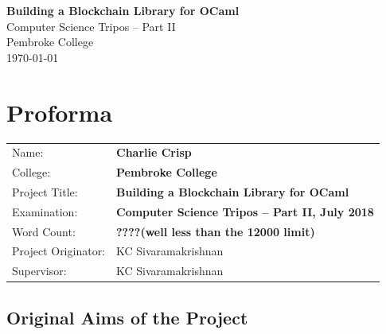 \documentclass[12pt,a4paper,twoside,openright]{report}
\begin{document}
	
	
	
	
	
	
	\pagestyle{empty}
	
	
	\vspace*{60mm}
	\begin{center}
	\Huge
	\textbf{Building a Blockchain Library for OCaml} \\[5mm]
	Computer Science Tripos -- Part II \\[5mm]
	Pembroke College \\[5mm]
	\today  %
	\end{center}
	
	
	\pagestyle{plain}
	
	\chapter*{Proforma}
	
	{\large
	\begin{tabular}{ll}
	Name:               & \bf Charlie Crisp                       \\
	College:            & \bf Pembroke College                     \\
	Project Title:      & \bf Building a Blockchain Library for OCaml \\
	Examination:        & \bf Computer Science Tripos -- Part II, July 2018  \\
	Word Count:         & \bf ????\footnotemark[1]
												(well less than the 12000 limit)  \\
	Project Originator: & KC Sivaramakrishnan                    \\
	Supervisor:         & KC Sivaramakrishnan                    \\ 
	\end{tabular}
	}
	
	
	\section*{Original Aims of the Project}
	
\end{document}
